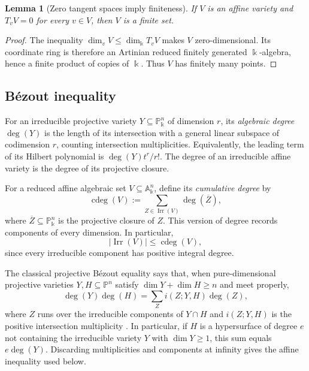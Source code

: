 \documentclass[11pt]{amsart}
\newtheorem{lemma}[theorem]{Lemma}
\theoremstyle{definition}
\theoremstyle{remark}
\newcommand{\kk}{\Bbbk}
\DeclareMathOperator{\Irr}{Irr}
\DeclareMathOperator{\cdeg}{cdeg}
\begin{document}
\begin{lemma}[Zero tangent spaces imply finiteness]\label{lem:zero-tangent}
If $V$ is an affine variety and $T_vV=0$ for every $v\in V$, then $V$ is a
finite set.
\end{lemma}

\begin{proof}
The inequality $\dim_vV\leq\dim_{\kk}T_vV$ makes $V$ zero-dimensional.  Its
coordinate ring is therefore an Artinian reduced finitely generated
$\kk$-algebra, hence a finite product of copies of $\kk$.  Thus $V$ has
finitely many points.
\end{proof}

\subsection*{B\'ezout inequality}

For an irreducible projective variety $Y\subseteq\mathbb P^n_{\kk}$ of
dimension $r$, its \emph{algebraic degree} $\deg(Y)$ is the length of its
intersection with a general linear subspace of codimension $r$, counting
intersection multiplicities.  Equivalently, the leading term of its
Hilbert polynomial is $\deg(Y)t^r/r!$.  The degree of an irreducible
affine variety is the degree of its projective closure.

For a reduced affine algebraic set $V\subseteq\mathbb A^n_{\kk}$, define its
\emph{cumulative degree} by
\begin{equation}\label{eq:cumulative-degree}
 \cdeg(V):=\sum_{Z\in\Irr(V)}\deg(\overline Z),
\end{equation}
where $\overline Z\subseteq\mathbb P^n_{\kk}$ is the projective closure of
$Z$.  This version of degree records components of every dimension.  In
particular,
\begin{equation}\label{eq:components-degree}
 |\Irr(V)|\leq\cdeg(V),
\end{equation}
since every irreducible component has positive integral degree.

The classical projective B\'ezout equality says that, when
pure-dimensional projective varieties $Y,H\subseteq\mathbb P^n$ satisfy
$\dim Y+\dim H\geq n$ and meet properly,
\[
 \deg(Y)\deg(H)=\sum_Z i(Z;Y,H)\deg(Z),
\]
where $Z$ runs over the irreducible components of $Y\cap H$ and
$i(Z;Y,H)$ is the positive intersection multiplicity
\cite[Theorem~18.4]{Harris}.  In particular, if $H$ is a hypersurface of
degree $e$ not containing the irreducible variety $Y$ with $\dim Y\geq1$,
this sum equals
$e\deg(Y)$.  Discarding multiplicities and components at infinity gives
the affine inequality used below.
\end{document}
